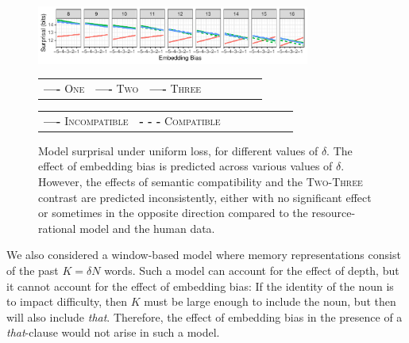 \begin{figure}
    \centering
    \includegraphics[width=0.8\textwidth]{figures/predictions-surprisal-uniform_Bits.pdf}

        \begin{tabular}{llllllll}
\textbf{\textcolor{one}{----}} \textsc{One}&
\textbf{\textcolor{two}{----}} \textsc{Two}&
\textbf{\textcolor{three}{----}} \textsc{Three}
\end{tabular}
    
    \begin{tabular}{llllllll}
\textbf{{----}} \textsc{Incompatible}&
\textbf{{- - -}} \textsc{Compatible}
\end{tabular}
    
    
 
	\caption{Model surprisal under uniform loss, for different values of $\delta$. The effect of embedding bias is predicted across various values of $\delta$. However, the effects of semantic compatibility and the \textsc{Two}-\textsc{Three} contrast are predicted inconsistently, either with no significant effect or sometimes in the opposite direction compared to the resource-rational model and the human data.}
    \label{fig:uniform-loss}
\end{figure}


We also considered a window-based model where memory representations consist of the past $K = \delta N$ words.
Such a model can account for the effect of depth, but it cannot account for the effect of embedding bias: If the identity of the noun is to impact difficulty, then $K$ must be large enough to include the noun, but then will also include \textit{that}. Therefore, the effect of embedding bias in the presence of a \textit{that}-clause would not arise in such a model.


